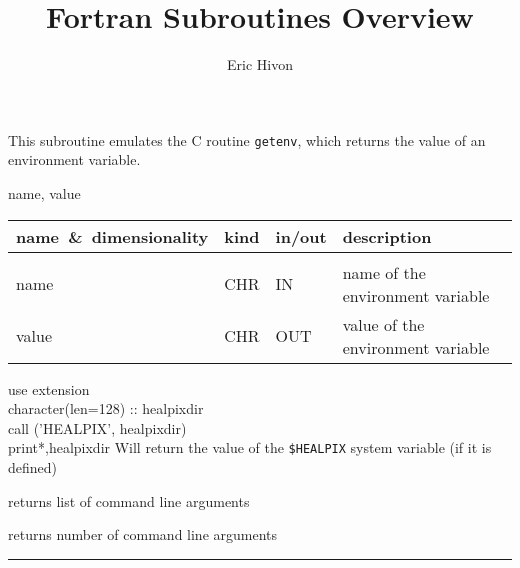 \sloppy

\title{\healpix Fortran Subroutines Overview}
 \section[getEnvironment]{ }
\label{sub:getenvironment}
\author{Eric Hivon}

\begin{facility}
{This subroutine emulates the C routine {\tt getenv}, which returns the value of
an environment variable.}
{\modExtension}
\end{facility}

\begin{f90format}
{name, value}
\end{f90format}

\begin{arguments}
{
\begin{tabular}{p{0.3\hsize} p{0.05\hsize} p{0.1\hsize} p{0.45\hsize}} \hline  
\textbf{name~\&~dimensionality} & \textbf{kind} & \textbf{in/out} & \textbf{description} \\ \hline
                   &   &   &                           \\ %
name & CHR & IN & name of the environment variable \\
value & CHR & OUT & value of the environment variable 
\end{tabular}}
\end{arguments}

\begin{example}
{
use extension \\
character(len=128) :: healpixdir \\
call \thedocid('HEALPIX', healpixdir) \\
print*,healpixdir
}
{
Will return the value of the {\tt \$HEALPIX} system variable (if it is defined)
}
\end{example}

\begin{related}
  \begin{sulist}{} %
  \item[\htmlref{getArgument}{sub:getargument}] returns list of command line arguments
  \item[\htmlref{nArguments}{sub:narguments}] returns number of command line arguments
  \end{sulist}
\end{related}

\rule{\hsize}{2mm}

\newpage
